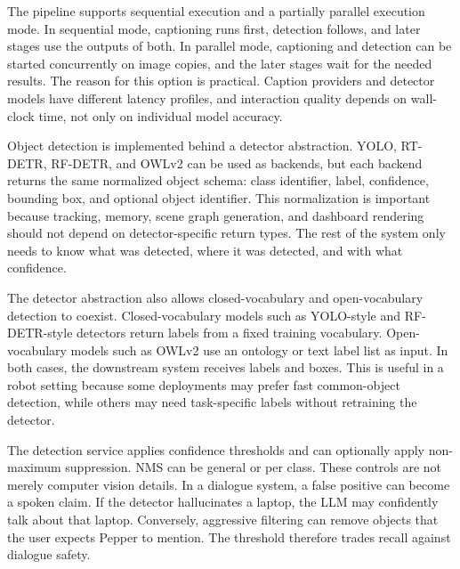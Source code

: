 The pipeline supports sequential execution and a partially parallel execution mode. In sequential mode, captioning runs first, detection follows, and later stages use the outputs of both. In parallel mode, captioning and detection can be started concurrently on image copies, and the later stages wait for the needed results. The reason for this option is practical. Caption providers and detector models have different latency profiles, and interaction quality depends on wall-clock time, not only on individual model accuracy.

Object detection is implemented behind a detector abstraction. YOLO, RT-DETR, RF-DETR, and OWLv2 can be used as backends, but each backend returns the same normalized object schema: class identifier, label, confidence, bounding box, and optional object identifier. This normalization is important because tracking, memory, scene graph generation, and dashboard rendering should not depend on detector-specific return types. The rest of the system only needs to know what was detected, where it was detected, and with what confidence.

The detector abstraction also allows closed-vocabulary and open-vocabulary detection to coexist. Closed-vocabulary models such as YOLO-style and RF-DETR-style detectors return labels from a fixed training vocabulary. Open-vocabulary models such as OWLv2 use an ontology or text label list as input. In both cases, the downstream system receives labels and boxes. This is useful in a robot setting because some deployments may prefer fast common-object detection, while others may need task-specific labels without retraining the detector.

The detection service applies confidence thresholds and can optionally apply non-maximum suppression. NMS can be general or per class. These controls are not merely computer vision details. In a dialogue system, a false positive can become a spoken claim. If the detector hallucinates a laptop, the LLM may confidently talk about that laptop. Conversely, aggressive filtering can remove objects that the user expects Pepper to mention. The threshold therefore trades recall against dialogue safety.

